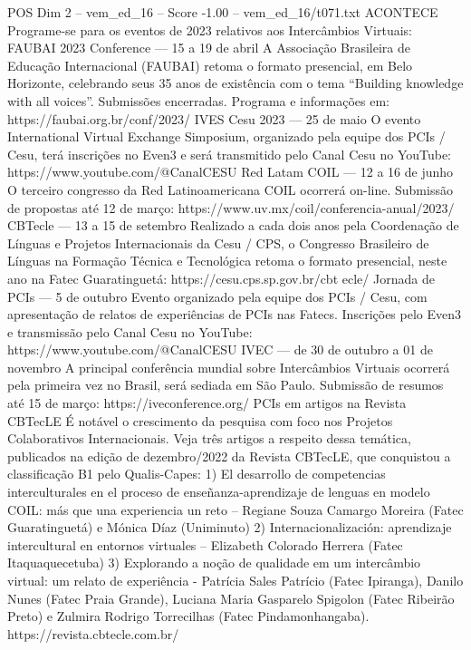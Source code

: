 \begin{textsample}{POS Dim 2 – vem\_ed\_16 – Score -1.00 – vem\_ed\_16/t071.txt}  \label{ex:f2_pos_020}
ACONTECE Programe-se para os eventos de 2023 relativos aos Intercâmbios Virtuais: FAUBAI 2023 Conference — 15 a 19 de abril A Associação Brasileira de Educação Internacional (FAUBAI) retoma o formato presencial, em Belo Horizonte, celebrando seus 35 anos de existência com o tema “Building knowledge with all voices”.
Submissões encerradas.
Programa e informações em: https://faubai.org.br/conf/2023/ IVES Cesu 2023 — 25 de maio O evento International Virtual Exchange Simposium, organizado pela equipe dos PCIs / Cesu, terá inscrições no Even3 e será transmitido pelo Canal Cesu no YouTube: https://www.youtube.com/@CanalCESU Red Latam COIL — 12 a 16 de junho O terceiro congresso da Red Latinoamericana COIL ocorrerá on-line.
Submissão de propostas até 12 de março: https://www.uv.mx/coil/conferencia-anual/2023/ CBTecle — 13 a 15 de setembro Realizado a cada dois anos pela Coordenação de Línguas e Projetos Internacionais da Cesu / CPS, o Congresso Brasileiro de Línguas na Formação Técnica e Tecnológica retoma o formato presencial, neste ano na Fatec Guaratinguetá: https://cesu.cps.sp.gov.br/cbt ecle/ Jornada de PCIs — 5 de outubro Evento organizado pela equipe dos PCIs / Cesu, com apresentação de relatos de experiências de PCIs nas Fatecs.
Inscrições pelo Even3 e transmissão pelo Canal Cesu no YouTube: https://www.youtube.com/@CanalCESU IVEC — de 30 de outubro a 01 de novembro A principal conferência mundial sobre Intercâmbios Virtuais ocorrerá pela primeira vez no Brasil, será sediada em São Paulo.
Submissão de resumos até 15 de março: https://iveconference.org/ PCIs em artigos na Revista CBTecLE É notável o crescimento da pesquisa com foco nos Projetos Colaborativos Internacionais.
Veja três artigos a respeito dessa temática, publicados na edição de dezembro/2022 da Revista CBTecLE, que conquistou a classificação B1 pelo Qualis-Capes: 1) El desarrollo de competencias interculturales en el proceso de enseñanza-aprendizaje de lenguas en modelo COIL: más que una experiencia un reto – Regiane Souza Camargo Moreira (Fatec Guaratinguetá) e Mónica Díaz (Uniminuto) 2) Internacionalización: aprendizaje intercultural en entornos virtuales – Elizabeth Colorado Herrera (Fatec Itaquaquecetuba) 3) Explorando a noção de qualidade em um intercâmbio virtual: um relato de experiência - Patrícia Sales Patrício (Fatec Ipiranga), Danilo Nunes (Fatec Praia Grande), Luciana Maria Gasparelo Spigolon (Fatec Ribeirão Preto) e Zulmira Rodrigo Torrecilhas (Fatec Pindamonhangaba). https://revista.cbtecle.com.br/

\end{textsample}
